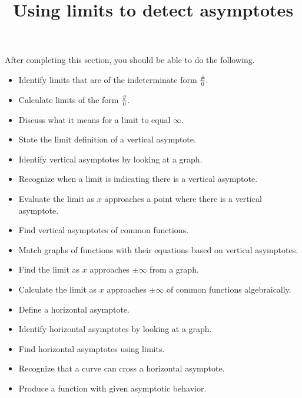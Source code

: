 \documentclass{ximera}
\title{Using limits to detect asymptotes}
\begin{document}
\begin{abstract}
\end{abstract}

\maketitle

\begin{sectionOutcomes}

After completing this section, you should be able to do the following.

\begin{itemize}
\item Identify limits that are of the indeterminate form $\frac{\#}{0}$.
\item Calculate limits of the form $\frac{\#}{0}$.
\item Discuss what it means for a limit to equal $\infty$.
\item State the limit definition of a vertical asymptote.
\item Identify vertical asymptotes by looking at a graph.
\item Recognize when a limit is indicating there is a vertical asymptote.
\item Evaluate the limit as $x$ approaches a point where there is a vertical asymptote.
\item Find vertical asymptotes of common functions.
\item Match graphs of functions with their equations based on vertical asymptotes.
\item Find the limit as $x$ approaches $\pm \infty$ from a graph.
\item Calculate the limit as $x$ approaches $\pm \infty$ of common functions algebraically.
\item Define a horizontal asymptote.
\item Identify horizontal asymptotes by looking at a graph.
\item Find horizontal asymptotes using limits.
\item Recognize that a curve can cross a horizontal asymptote.
\item Produce a function with given asymptotic behavior.
\end{itemize}
\end{sectionOutcomes}
\end{document}

